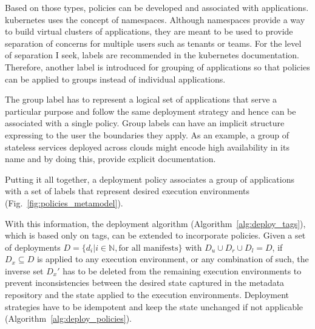 \documentclass[../main.tex]{subfiles}
\begin{document}
    Based on those types, policies can be developed and associated with applications.
    \gls{kubernetes} uses the concept of namespaces.
    Although namespaces provide a way to build virtual clusters of applications, they are meant to be used to provide separation of concerns for multiple users such as tenants or teams.
    For the level of separation I seek, labels are recommended in the \gls{kubernetes} documentation.
    Therefore, another label is introduced for grouping of applications so that policies can be applied to groups instead of individual applications.\cite{k8s_namespaces}

    The group label has to represent a logical set of applications that serve a particular purpose and follow the same deployment strategy and hence can be associated with a single policy.
    Group labels can have an implicit structure expressing to the user the boundaries they apply.
    As an example, a group of stateless services deployed across \glspl{cloud} might encode high availability in its name and by doing this, provide explicit documentation.

    Putting it all together, a deployment policy associates a group of applications with a set of labels that represent desired execution environments (Fig.~\ref{fig:policies_metamodel}).

    

    With this information, the deployment algorithm (Algorithm~\ref{alg:deploy_tags}), which is based only on tags, can be extended to incorporate policies.
    Given a set of deployments $D = \{ d_i | i \in \mathbb{N} , \text{for all manifests} \}$ with $D_u \cup D_r \cup D_l = D$, if $D_x \subseteq D$ is applied to any execution environment, or any combination of such, the inverse set $D_x'$ has to be deleted from the remaining execution environments to prevent inconsistencies between the desired state captured in the metadata repository and the state applied to the execution environments.
    Deployment strategies have to be idempotent and keep the state unchanged if not applicable (Algorithm~\ref{alg:deploy_policies}).

    ~\\
    
\end{document}
